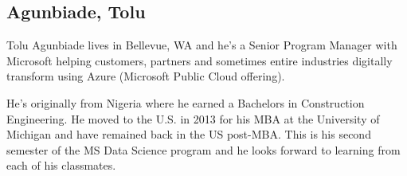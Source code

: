 
\subsection{Agunbiade, Tolu}

Tolu Agunbiade lives in Bellevue, WA and he's a Senior Program Manager with Microsoft helping customers, partners and sometimes entire industries digitally transform using Azure (Microsoft Public Cloud offering).

He's originally from Nigeria where he earned a Bachelors in Construction Engineering. He moved to the U.S. in 2013 for his MBA at the University of Michigan and have remained back in the US post-MBA. 
This is his second semester of the MS Data Science program and he looks forward to learning from each of his classmates.

